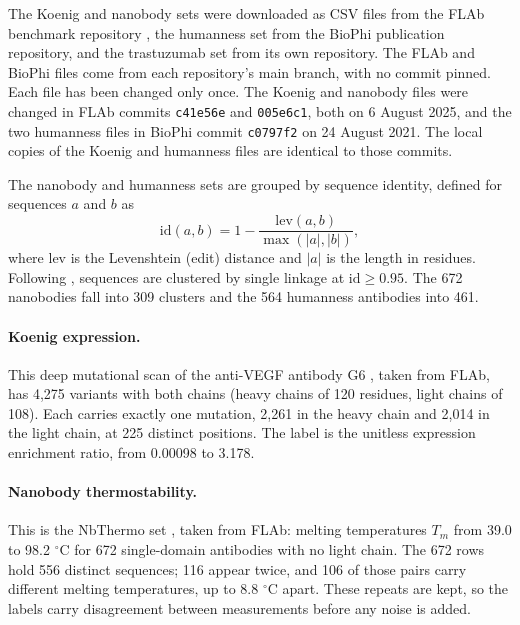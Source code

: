 The Koenig and nanobody sets were downloaded as CSV files from the FLAb benchmark repository \citep{Chungyoun2024}, the humanness set from the BioPhi publication repository, and the trastuzumab set from its own repository. The FLAb and BioPhi files come from each repository's main branch, with no commit pinned. Each file has been changed only once. The Koenig and nanobody files were changed in FLAb commits \texttt{c41e56e} and \texttt{005e6c1}, both on 6 August 2025, and the two humanness files in BioPhi commit \texttt{c0797f2} on 24 August 2021. The local copies of the Koenig and humanness files are identical to those commits.

The nanobody and humanness sets are grouped by sequence identity, defined for sequences $a$ and $b$ as
\begin{equation}
\mathrm{id}(a,b) = 1 - \frac{\mathrm{lev}(a,b)}{\max(|a|,|b|)},
\end{equation}
where $\mathrm{lev}$ is the Levenshtein (edit) distance and $|a|$ is the length in residues. Following \citet{Kenlay2024}, sequences are clustered by single linkage at $\mathrm{id} \ge 0.95$. The 672 nanobodies fall into 309 clusters and the 564 humanness antibodies into 461.

\paragraph{Koenig expression.} This deep mutational scan of the anti-VEGF antibody G6 \citep{Koenig2017}, taken from FLAb, has 4,275 variants with both chains (heavy chains of 120 residues, light chains of 108). Each carries exactly one mutation, 2,261 in the heavy chain and 2,014 in the light chain, at 225 distinct positions. The label is the unitless expression enrichment ratio, from 0.00098 to 3.178.

\paragraph{Nanobody thermostability.} This is the NbThermo set \citep{ValdesTresanco2023}, taken from FLAb: melting temperatures $T_m$ from 39.0 to 98.2 $^\circ$C for 672 single-domain antibodies with no light chain. The 672 rows hold 556 distinct sequences; 116 appear twice, and 106 of those pairs carry different melting temperatures, up to 8.8 $^\circ$C apart. These repeats are kept, so the labels carry disagreement between measurements before any noise is added.

